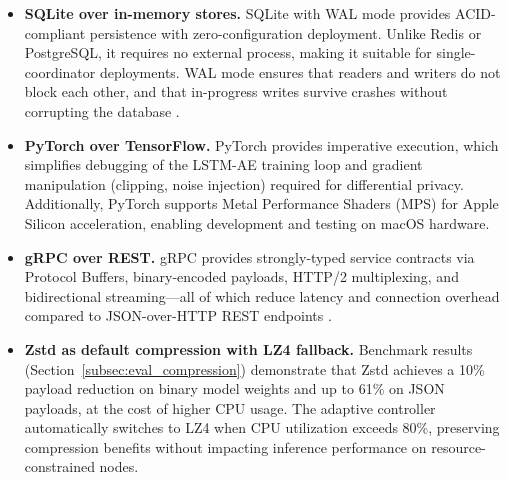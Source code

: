 \begin{itemize}
    \item \textbf{SQLite over in-memory stores.} SQLite with WAL mode provides
    ACID-compliant persistence with zero-configuration deployment. Unlike Redis
    or PostgreSQL, it requires no external process, making it suitable for
    single-coordinator deployments. WAL mode ensures that readers and writers
    do not block each other, and that in-progress writes survive crashes
    without corrupting the database \cite{ongaro2014raft}.

    \item \textbf{PyTorch over TensorFlow.} PyTorch provides imperative
    execution, which simplifies debugging of the LSTM-AE training loop and
    gradient manipulation (clipping, noise injection) required for differential
    privacy. Additionally, PyTorch supports Metal Performance Shaders (MPS)
    for Apple Silicon acceleration, enabling development and testing on macOS
    hardware.

    \item \textbf{gRPC over REST.} gRPC provides strongly-typed service
    contracts via Protocol Buffers, binary-encoded payloads, HTTP/2
    multiplexing, and bidirectional streaming---all of which reduce latency
    and connection overhead compared to JSON-over-HTTP REST endpoints
    \cite{grpc2016whitepaper}.

    \item \textbf{Zstd as default compression with LZ4 fallback.} Benchmark
    results (Section~\ref{subsec:eval_compression}) demonstrate that Zstd
    achieves a 10\% payload reduction on binary model weights and up to 61\%
    on JSON payloads, at the cost of higher CPU usage. The adaptive controller
    automatically switches to LZ4 when CPU utilization exceeds 80\%, preserving
    compression benefits without impacting inference performance on
    resource-constrained nodes.
\end{itemize}
